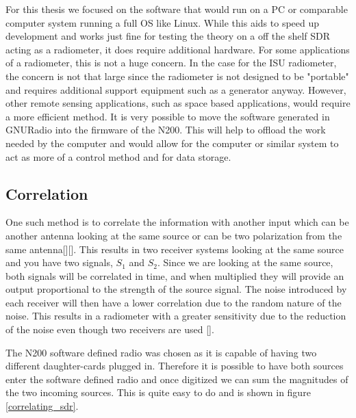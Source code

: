 For this thesis we focused on the software that would run on a PC or comparable computer system running a full OS like Linux.  While this aids to speed up development and works just fine for testing the theory on a off the shelf SDR acting as a radiometer, it does require additional hardware.  For some applications of a radiometer, this is not a huge concern.  In the case for the ISU radiometer, the concern is not that large since the radiometer is not designed to be "portable" and requires additional support equipment such as a generator anyway.  However, other remote sensing applications, such as space based applications, would require a more efficient method.  It is very possible to move the software generated in GNURadio into the firmware of the N200.  This will help to offload the work needed by the computer and would allow for the computer or similar system to act as more of a control method and for data storage.  

\subsection{Correlation}  
One such method is to correlate the information with another input which can be another antenna looking at the same source or can be two polarization from the same antenna[\cite{Clapp}][\cite{Aitken}].  This results in two receiver systems looking at the same source and you have two signals, $S_1$ and $S_2$.  Since we are looking at the same source, both signals will be correlated in time, and when multiplied they will provide an output proportional to the strength of the source signal.  The noise introduced by each receiver will then have a lower correlation due to the random nature of the noise.  This results in a radiometer with a greater sensitivity due to the reduction of the noise even though two receivers are used [\cite{Fujimoto}].

The N200 software defined radio was chosen as it is capable of having two different daughter-cards plugged in.  Therefore it is possible to have both sources enter the software defined radio and once digitized we can sum the magnitudes of the two incoming sources.  This is quite easy to do and is shown in figure \ref{correlating_sdr}.

